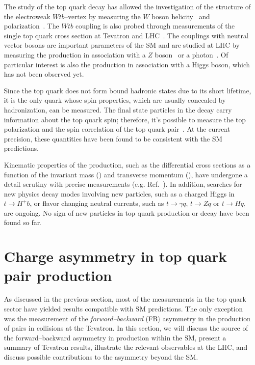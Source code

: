 The study of the top quark decay has allowed the investigation of the structure of the
electroweak $Wtb$--vertex by measuring the $W$ boson
helicity~\cite{Khachatryan:2014vma} and
polarization~\cite{ATLAS-CONF-2013-033}.
The $Wtb$ coupling is also probed through measurements of the single
top quark cross section at Tevatron and LHC~\cite{Aad:2014fwa}.
The couplings with neutral vector bosons are important parameters of the SM
and are studied at LHC by measuring the \ttbar{} production in
association with a $Z$ boson~\cite{ATLAS-CONF-2014-038} or a
photon~\cite{CMS-PAS-TOP-13-011}. Of particular interest is also the
\ttbar{} production in association with a Higgs boson, which has not
been observed yet.

Since the top quark does not form bound hadronic states due to its
short lifetime, it is the only quark whose spin properties, which are usually
concealed by hadronization, can be measured. The final state
particles in the decay carry information about the top quark spin;
therefore, it's possible to measure the top polarization and the spin
correlation of the top quark
pair~\cite{Aad:2013ksa,Aad:2014pwa,Chatrchyan:2013wua}. At the current
precision, these quantities have been found to be consistent with the SM
predictions. 

Kinematic properties of the \ttbar{} production, such as the
differential cross sections as a function of the \ttbar{} invariant
mass (\mtt{}) and transverse momentum (\pttt{}), have undergone a
detail scrutiny with precise measurements
(e.g. Ref.~\cite{ATLAS-CONF-2014-057}).
In addition, searches for new physics
decay modes involving new particles, such as a charged Higgs in $t\to
H^+b$, or flavor changing neutral currents, such as $t\to \gamma q$,
$t\to Z q$ or $t\to H q$, are ongoing.
No sign of new particles in top quark production or decay have been
found so far.

\section{Charge asymmetry in top quark pair production}
\label{sec:topca}

As discussed in the previous section, most of the measurements in the
top quark sector have yielded results compatible with SM predictions.
The only exception was the measurement of the {\it forward--backward}
(FB) asymmetry in the production of \ttbar{} pairs in \ppbar{}
collisions at the Tevatron. In this section, we will discuss the
source of the forward--backward asymmetry in \ttbar{} production
within the SM, present a summary of Tevatron results, illustrate the
relevant observables at the LHC, and discuss possible contributions to
the asymmetry beyond the SM.

